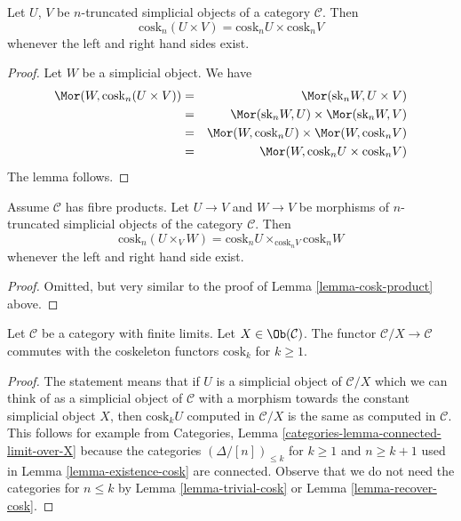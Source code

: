 \begin{lemma}
\label{lemma-cosk-product}
Let $U$, $V$ be $n$-truncated simplicial objects of a
category $\mathcal{C}$. Then
$$
\text{cosk}_n (U \times V) = \text{cosk}_nU \times \text{cosk}_nV
$$
whenever the left and right hand sides exist.
\end{lemma}

\begin{proof}
Let $W$ be a simplicial object. We have
\begin{eqnarray*}
\Mor(W, \text{cosk}_n (U \times V))
& = &
\Mor(\text{sk}_n W, U \times V) \\
& = &
\Mor(\text{sk}_n W, U)
\times
\Mor(\text{sk}_nW, V) \\
& = &
\Mor(W, \text{cosk}_n U)
\times
\Mor(W, \text{cosk}_n V) \\
& = &
\Mor(W, \text{cosk}_n U \times \text{cosk}_n V)
\end{eqnarray*}
The lemma follows.
\end{proof}

\begin{lemma}
\label{lemma-cosk-fibre-product}
Assume $\mathcal{C}$ has fibre products.
Let $U \to V$ and $W \to V$ be morphisms
of $n$-truncated simplicial objects of the
category $\mathcal{C}$. Then
$$
\text{cosk}_n (U \times_V W)
=
\text{cosk}_nU \times_{\text{cosk}_n V} \text{cosk}_nW
$$
whenever the left and right hand side exist.
\end{lemma}

\begin{proof}
Omitted, but very similar to the proof of
Lemma \ref{lemma-cosk-product} above.
\end{proof}

\begin{lemma}
\label{lemma-cosk-above-object}
Let $\mathcal{C}$ be a category with finite limits.
Let $X \in \Ob(\mathcal{C})$.
The functor $\mathcal{C}/X \to \mathcal{C}$ commutes with
the coskeleton functors $\text{cosk}_k$ for $k \geq 1$.
\end{lemma}

\begin{proof}
The statement means that if $U$ is a simplicial object of $\mathcal{C}/X$
which we can think of as a simplicial object of $\mathcal{C}$ with a morphism
towards the constant simplicial object $X$, then $\text{cosk}_k U$
computed in $\mathcal{C}/X$ is the same as computed in $\mathcal{C}$.
This follows for example from
Categories, Lemma \ref{categories-lemma-connected-limit-over-X}
because the categories $(\Delta/[n])_{\leq k}$ for $k \geq 1$ and
$n \geq k + 1$ used in Lemma \ref{lemma-existence-cosk}
are connected. Observe that we do not need the categories
for $n \leq k$ by Lemma \ref{lemma-trivial-cosk} or
Lemma \ref{lemma-recover-cosk}.
\end{proof}

